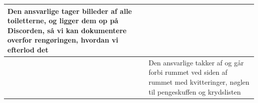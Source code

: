 \documentclass[a4paper,10pt,oneside,article]{memoir}
\begin{document}
\begin{tabular}{|l|l|}
\begin{minipage}[t]{0.80\textwidth}
        Den ansvarlige tager billeder af alle toiletterne, og ligger dem op
        på Discorden, så vi kan dokumentere overfor rengøringen, hvordan vi 
        efterlod det
    \end{minipage} \\
    \hline
    \begin{minipage}[t]{0.15\textwidth}
    \end{minipage} & 
    \begin{minipage}[t]{0.80\textwidth}
        Den ansvarlige takker af og går forbi rummet ved siden af rummet 
        med kvitteringer, nøglen til pengeskuffen og krydslisten
    \end{minipage} \\
    \hline
\end{tabular}

\vfill
\end{document}

